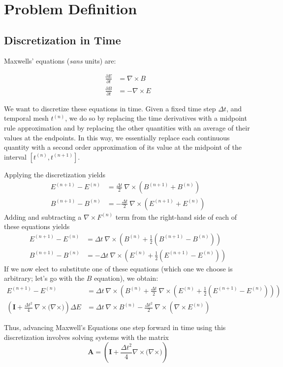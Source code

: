\documentclass{article}
\newcommand{\dd}[2]{\frac{\partial #1}{\partial #2}}
\newcommand{\Fnijk}[5]{{#1}^{(#2)}_{{#3}{#4}{#5}}}
\newcommand{\Fn}[2]{\Fnijk{#1}{#2}{{}}{{}}{{}}}
\newcommand{\curl}[1]{\nabla \times {#1}}
\newcommand{\Enpo}{\Fn{E}{n+1}}
\newcommand{\Bnpo}{\Fn{B}{n+1}}
\newcommand{\En}{\Fn{E}{n}}
\newcommand{\Bn}{\Fn{B}{n}}
\newcommand{\dt}{\Delta t}
\newcommand{\iden}{\mathbf{I}}
\begin{document}
\section{Problem Definition} 

\subsection{Discretization in Time}
Maxwells' equations ({\it sans} units) are:

\begin{align*}
  \dd{E}{t} &= \curl{B} \\
  \dd{B}{t} &= - \curl{E}
\end{align*}

We want to discretize these equations in time.
Given a fixed time step $\Delta t$, and temporal mesh $\Fn{t}{n}$, we do so by replacing
the time derivatives with a midpoint rule approximation and by replacing
the other quantities with an average of their values at the
endpoints.
In this way, we essentially replace each continuous
quantity with a second order approximation of its value at the
midpoint of the interval $[\Fn{t}{n}, \Fn{t}{n+1}]$.

Applying the discretization yields
\begin{align*}
  \Enpo - \En &= \frac{\dt}{2} ~\curl{ ( \Bnpo + \Bn ) } \\
  \Bnpo - \Bn &= - \frac{\dt}{2} ~\curl{ ( \Enpo + \En ) }
\end{align*}
Adding and subtracting a $\curl{\Fn{F}{n}}$ term from the right-hand side of
each of these equations yields
\begin{align*}
  \Enpo - \En &=  \dt ~\curl{\left( \Bn + \frac{1}{2} (\Bnpo -
      \Bn) \right)} \\
  \Bnpo - \Bn &= - \dt ~\curl{\left( \En + \frac{1}{2} (\Enpo -
      \En) \right)}
\end{align*}
If we now elect to substitute one of these equations (which one we
choose is arbitrary; let's go with the $B$ equation), we obtain:
\begin{align*}
  \Enpo - \En &= \dt ~\curl{\left( \Bn + \frac{\dt}{2}~\curl{\left( \En + \frac{1}{2} (\Enpo -
        \En) \right)} \right)} \\
\left(\iden + \frac{\dt^2}{4} ~\curl{(\curl)} \right) \Delta E &= \dt ~\curl{\Bn} -
\frac{\dt^2}{2} ~\curl{(\curl{\En})}
\end{align*}

Thus, advancing Maxwell's Equations one step forward in time using
this discretization involves solving systems with the matrix
\[
\mathbf{A} = \left(\iden + \frac{\dt^2}{4} \curl{(\curl)} \right)
\]
\end{document}
